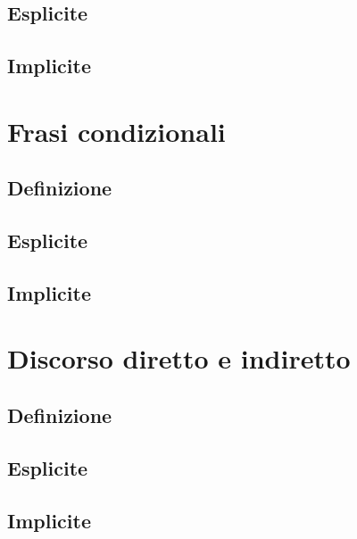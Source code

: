 \documentclass[a4paper,twoside,11pt,chapterprefix=false,bibliography=totocnumbered,listof=flat]{scrbook}
\begin{document}
\hypertarget{esplicite-5}{%
\section{Esplicite}\label{esplicite-5}}

\hypertarget{implicite-5}{%
\section{Implicite}\label{implicite-5}}

\hypertarget{frasi-condizionali}{%
\chapter{Frasi condizionali}\label{frasi-condizionali}}

\hypertarget{definizione-4}{%
\section{Definizione}\label{definizione-4}}

\hypertarget{esplicite-6}{%
\section{Esplicite}\label{esplicite-6}}

\hypertarget{implicite-6}{%
\section{Implicite}\label{implicite-6}}

\hypertarget{discorso-diretto-e-indiretto}{%
\chapter{Discorso diretto e
indiretto}\label{discorso-diretto-e-indiretto}}

\hypertarget{definizione-5}{%
\section{Definizione}\label{definizione-5}}

\hypertarget{esplicite-7}{%
\section{Esplicite}\label{esplicite-7}}

\hypertarget{implicite-7}{%
\section{Implicite}\label{implicite-7}}


\end{document}
